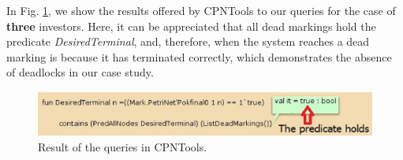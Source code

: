 In Fig. \ref{queries}, we show the results offered by CPNTools to
our queries for the case of {\bf three} investors. Here, it can be
appreciated that all dead markings hold the predicate {\em DesiredTerminal}, and, therefore, when the system reaches a dead marking is because it has terminated correctly, which demonstrates the absence of deadlocks in our case study. 
\vspace{-0.2cm}
\begin{figure}[h]
\begin{center}%
\includegraphics[width=\columnwidth,height=1.5cm]{Images/queries.eps}
\vspace{-0.7cm}
\caption{Result of the queries in CPNTools.}\label{queries}
\end{center}
\end{figure}
%
%

